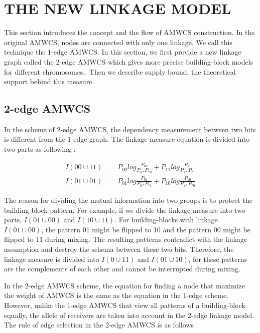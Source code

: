 \documentclass{sig-alternate-05-2015}
\begin{document}
\section{THE NEW LINKAGE MODEL}
This section introduces the concept and the flow of AMWCS construction. In the original AMWCS, nodes are connected with only one linkage. We call this technique the 1-edge AMWCS. In this section, we first provide a new linkage graph called the 2-edge AMWCS which gives more precise building-block models for different chromosomes.. Then we describe supply bound,  the theoretical support behind this measure. 

\subsection{2-edge AMWCS}
In the scheme of 2-edge AMWCS, the dependency measurement between two bits is different from the 1-edge graph. The linkage measure equation is divided into two parts as following : 

\begin{equation} 
\begin{split}
I( 00 \cup 11 ) &= P_{00 }log\frac{P_{00}}{P_{0*} P_{*0}} + P_{11 }log\frac{P_{11}}{P_{1*} P_{*1}}  \\
I( 01 \cup 01 ) &= P_{01 }log\frac{P_{01}}{P_{0*} P_{*1}} + P_{10 }log\frac{P_{10}}{P_{1*} P_{*0}}  
\end{split}
\end{equation}

The reason for dividing the mutual information into two groups is to protect the building-block pattern. For example, if we divide the linkage measure into two parts, $I(01 \cup 00)$ and $I (10 \cup 11)$. For building-blocks with linkage $I(01\cup00)$, the pattern 01 might be flipped to 10 and the pattern 00 might be flipped to 11 during mixing. The resulting patterns contradict with the linkage assumption and destroy the schema between these two bits. Therefore, the linkage measure is divided  into $I(0\cup11)$ and $I(01\cup10)$, for these patterns are the complements of each other and cannot be interrupted during mixing.


In the 2-edge AMWCS scheme, the equation for finding a node that maximize the weight of AMWCS is the same as the equation in the  1-edge scheme. However, unlike the 1-edge AMWCS that view all patterns of a building-block equally, the allele of receivers are taken into account in the 2-edge linkage model. The rule of edge selection in the 2-edge AMWCS is as follows :
\end{document}
